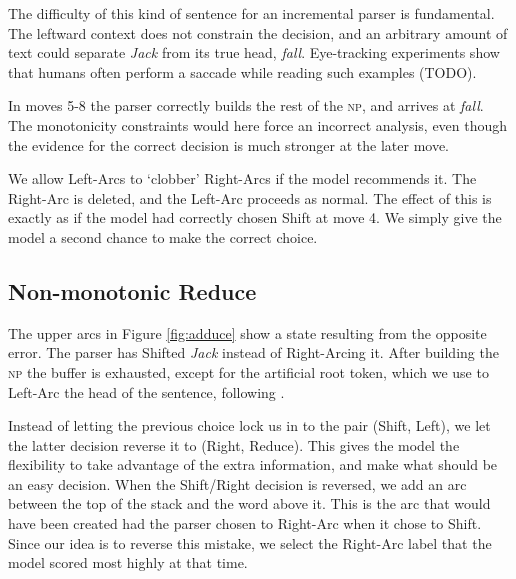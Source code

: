 \documentclass[11pt,letterpaper]{article}
\begin{document}
The difficulty of this kind of sentence for an incremental parser is fundamental.
The leftward context does not constrain the decision, 
and an arbitrary amount of text could separate \emph{Jack} from its true head,
\emph{fall}. Eye-tracking
experiments show that humans often perform a saccade while reading such examples (TODO).

In moves 5-8 the parser correctly builds the rest of the \textsc{np}, and arrives
at \emph{fall}. The monotonicity constraints would here force an incorrect analysis,
even though the evidence for the correct decision is much stronger at the later move.

We allow Left-Arcs to `clobber' Right-Arcs if the model
recommends it. The Right-Arc is deleted, and the Left-Arc proceeds as normal. The
effect of this is exactly as if the model had correctly chosen Shift at
move 4. We simply give the model a second chance to make the correct choice.

\subsection{Non-monotonic Reduce}

The upper arcs in Figure \ref{fig:adduce} show a state resulting from the opposite error.
The parser has Shifted \emph{Jack} instead of Right-Arcing it. After
building the \textsc{np} the buffer is exhausted, except for the artificial root token,
which we use to Left-Arc the head of the sentence, following \citet{nivre:squib}.

Instead of letting the previous choice lock us in to the pair (Shift, Left), we let
the latter decision reverse it to (Right, Reduce). This gives the model the flexibility
to take advantage of the extra information, and make what should be an easy decision.
When the Shift/Right decision is reversed, we add an arc between the top of the stack
and the word above it. This is the arc that would have been created had the parser
chosen to Right-Arc when it chose to Shift. Since our idea is to reverse this mistake,
we select the Right-Arc label that the model scored most highly at that time.
\end{document}
